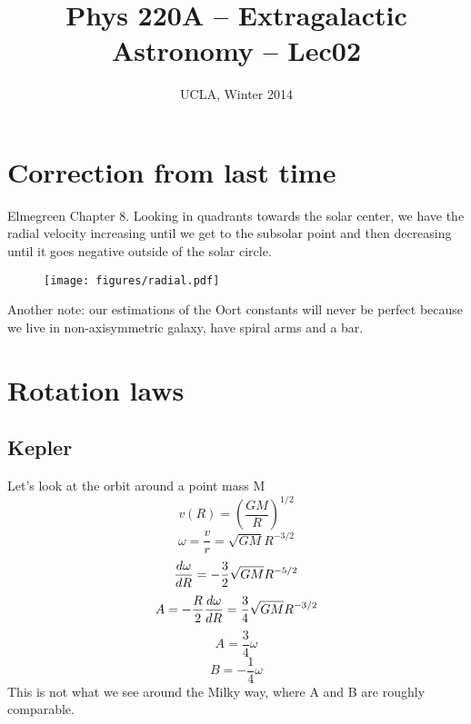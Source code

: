 
\usepackage[margin=1in]{geometry} %





\title{Phys 220A -- Extragalactic Astronomy -- Lec02}
\author{UCLA, Winter 2014}
\date{} %


\setlength{\unitlength}{1mm}
\maketitle

\section{Correction from last time}
Elmegreen Chapter 8. Looking in quadrants
towards the solar center, we have the radial velocity increasing until
we get to the subsolar point and then decreasing until it goes
negative outside of the solar circle. 
\begin{figure}
\centering
\texttt{[image: figures/radial.pdf]}
\end{figure}

Another note: our estimations of the Oort constants will never be
perfect because we live in non-axisymmetric galaxy, have spiral arms
and a bar. 


\section{Rotation laws}
\subsection{Kepler}
Let's look at the orbit around a point mass M
\begin{equation}
v(R) = \left(\frac{GM}{R}\right)^{1/2}
\end{equation}
\begin{equation}
\omega = \frac{v}{r} = \sqrt{GM} R^{-3/2}
\end{equation}
\begin{equation}
\frac{d \omega}{d R} = -\frac{3}{2} \sqrt{GM} R^{-5/2}
\end{equation}
\begin{equation}
A = - \frac{R}{2} \frac{d \omega}{d R} = \frac{3}{4} \sqrt{GM} R^{-3/2}
\end{equation}
\begin{equation}
A = \frac{3}{4} \omega
\end{equation}
\begin{equation}
B = -\frac{1}{4}\omega
\end{equation}
This is not what we see around the Milky way, where A and B are roughly comparable. 

